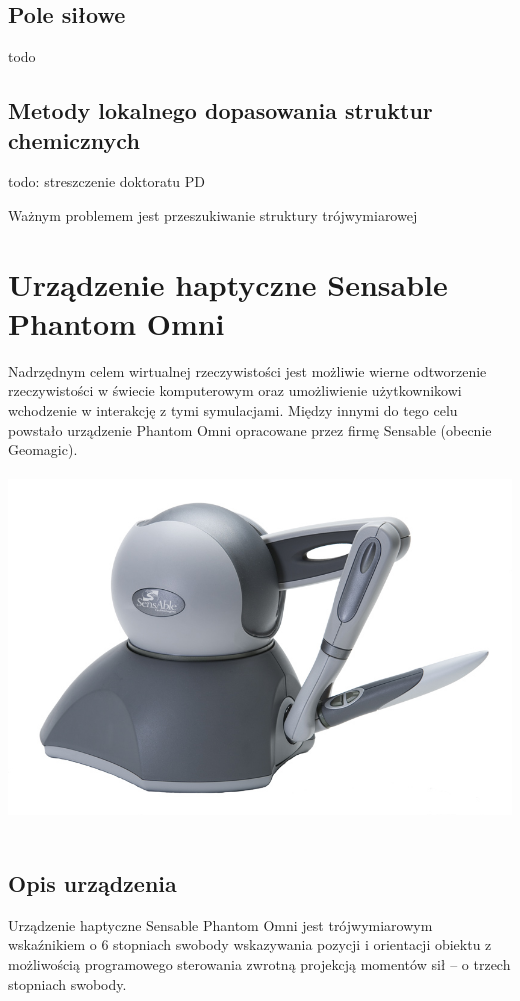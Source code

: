 \documentclass[licencjacka]{pracamgr}
\begin{document}
\section{Pole siłowe}
todo

\section{Metody lokalnego dopasowania struktur chemicznych}
todo: streszczenie doktoratu PD

Ważnym problemem jest przeszukiwanie struktury trójwymiarowej 

	
\chapter{Urządzenie haptyczne Sensable Phantom Omni}
Nadrzędnym celem wirtualnej rzeczywistości jest możliwie wierne odtworzenie rzeczywistości w świecie komputerowym oraz umożliwienie użytkownikowi wchodzenie w interakcję z tymi symulacjami. Między innymi do tego celu powstało urządzenie Phantom Omni opracowane przez firmę Sensable (obecnie Geomagic).
\\
\\
\includegraphics[scale=0.5,center]{Sensable_Phantom_Omni}
\\
\\
\section{Opis urządzenia}
Urządzenie haptyczne Sensable Phantom Omni jest trójwymiarowym wskaźnikiem o 6 stopniach swobody wskazywania pozycji i orientacji obiektu z możliwością programowego sterowania zwrotną projekcją momentów sił – o trzech stopniach swobody. 
\end{document}
